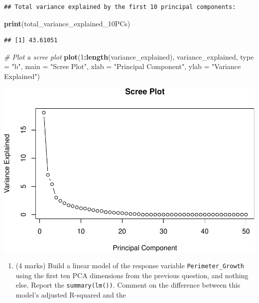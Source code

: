 \documentclass[
]{article}
\newenvironment{Shaded}{\begin{snugshade}}{\end{snugshade}}
\newcommand{\AttributeTok}[1]{\textcolor[rgb]{0.13,0.29,0.53}{#1}}
\newcommand{\CommentTok}[1]{\textcolor[rgb]{0.56,0.35,0.01}{\textit{#1}}}
\newcommand{\DecValTok}[1]{\textcolor[rgb]{0.00,0.00,0.81}{#1}}
\newcommand{\FunctionTok}[1]{\textcolor[rgb]{0.13,0.29,0.53}{\textbf{#1}}}
\newcommand{\NormalTok}[1]{#1}
\newcommand{\SpecialCharTok}[1]{\textcolor[rgb]{0.81,0.36,0.00}{\textbf{#1}}}
\newcommand{\StringTok}[1]{\textcolor[rgb]{0.31,0.60,0.02}{#1}}
\providecommand{\tightlist}{%
  \setlength{\itemsep}{0pt}\setlength{\parskip}{0pt}}
\begin{document}
\begin{verbatim}
## Total variance explained by the first 10 principal components:
\end{verbatim}

\begin{Shaded}
\begin{Highlighting}[]
\FunctionTok{print}\NormalTok{(total\_variance\_explained\_10PCs)}
\end{Highlighting}
\end{Shaded}

\begin{verbatim}
## [1] 43.61051
\end{verbatim}

\begin{Shaded}
\begin{Highlighting}[]
\CommentTok{\# Plot a scree plot}
\FunctionTok{plot}\NormalTok{(}\DecValTok{1}\SpecialCharTok{:}\FunctionTok{length}\NormalTok{(variance\_explained), variance\_explained, }\AttributeTok{type =} \StringTok{"b"}\NormalTok{, }
     \AttributeTok{main =} \StringTok{"Scree Plot"}\NormalTok{, }\AttributeTok{xlab =} \StringTok{"Principal Component"}\NormalTok{, }\AttributeTok{ylab =} \StringTok{"Variance Explained"}\NormalTok{)}
\end{Highlighting}
\end{Shaded}

\includegraphics{STAT847_W24_Analysis2_files/figure-latex/unnamed-chunk-7-1.pdf}

\newpage
\vspace{2cm}

\begin{enumerate}
\def\labelenumi{\arabic{enumi}.}
\setcounter{enumi}{6}
\tightlist
\item
  (4 marks) Build a linear model of the response variable
  \texttt{Perimeter\_Growth} using the first ten PCA dimensions from the
  previous question, and nothing else. Report the
  \texttt{summary(lm())}. Comment on the difference between this model's
  adjusted R-squared and the
\end{enumerate}
\end{document}

